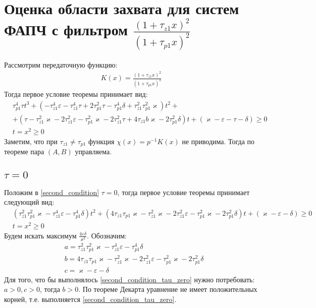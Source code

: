 \documentclass[a4paper]{article}
\begin{document}
 

\section{Оценка области захвата для систем ФАПЧ с фильтром $\frac{(1+\tau_{z1}x)^2}{(1+\tau_{p1}x)^2}$}
 Рассмотрим передаточную функцию:
 \begin{equation}\label{filter2}
 \begin{aligned}
K(x) = \frac{(1+\tau_{z1}x)^2}{(1+\tau_{p1}x)^2}
 \end{aligned}
\end{equation}
Тогда первое условие теоремы принимает вид:
 \begin{equation}\label{second_condition}
 \begin{aligned}
&\tau_{p1}^4\tau t^3 +(- \tau_{z1}^4\varepsilon - \tau_{z1}^4\tau + 2\tau_{p1}^2\tau- \tau_{p1}^4\delta + \tau_{z1}^2\tau_{p1}^2\varkappa)t^2  +\\
&+( \tau- \tau_{z1}^2\varkappa - 2\tau_{z1}^2\varepsilon - \tau_{p1}^2\varkappa- 2\tau_{z1}^2\tau+ 4\tau_{z1}b\varkappa- 2\tau_{p1}^2\delta)t + (\varkappa-\varepsilon - \tau - \delta)  \geq 0\\
&t = x^2 \geq 0
 \end{aligned}
\end{equation}
Заметим, что при $\tau_{z1} \neq \tau_{p1}$ функция $\chi (x) = p^{-1}K(x)$ не приводима. Тогда по теореме пара $(A, B)$ управляема.
\subsection{$\tau = 0$}
Положим в \eqref{second_condition} $\tau = 0$, тогда первое условие теоремы принимает следующий вид:
 \begin{equation}\label{second_condition_tau_zero}
 \begin{aligned}
&(\tau_{z1}^2\tau_{p1}^2\varkappa - \tau_{z1}^4\varepsilon - \tau_{p1}^4\delta)t^2 +( 4\tau_{z1}\tau_{p1}\varkappa - \tau_{z1}^2\varkappa - 2\tau_{z1}^2\varepsilon - \tau_{p1}^2\varkappa - 2\tau_{p1}^2\delta)t + (\varkappa-\varepsilon - \delta)  \geq 0\\
&t = x^2 \geq 0
 \end{aligned}
\end{equation}
Будем искать максимум $\frac{4\varepsilon\delta}{\varkappa^2}$. Обозначим:
 \begin{equation}
 \begin{aligned}
&a = \tau_{z1}^2\tau_{p1}^2\varkappa - \tau_{z1}^4\varepsilon - \tau_{p1}^4\delta\\
&b = 4\tau_{z1}\tau_{p1}\varkappa - \tau_{z1}^2\varkappa - 2\tau_{z1}^2\varepsilon - \tau_{p1}^2\varkappa - 2\tau_{p1}^2\delta\\
&c = \varkappa-\varepsilon - \delta
 \end{aligned}
\end{equation}
Для того, что бы выполнялось \eqref{second_condition_tau_zero} нужно потребовать: $a > 0, c > 0$, тогда $b > 0$. По теореме Декарта уравнение не имеет положительных корней, т.е. выполняется \eqref{second_condition_tau_zero}.
\end{document}
